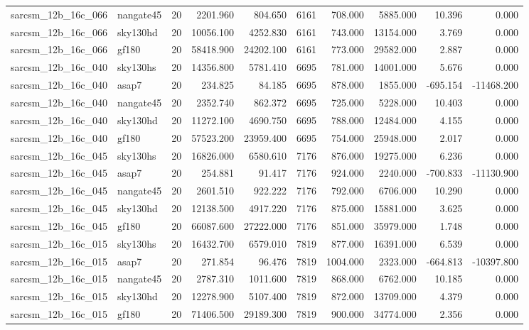 \begin{longtable}{llrrrrrrrr}
sarcsm\_12b\_16c\_066 & nangate45 & 20 & 2201.960 & 804.650 & 6161 & 708.000 & 5885.000 & 10.396 & 0.000 \\
sarcsm\_12b\_16c\_066 & sky130hd & 20 & 10056.100 & 4252.830 & 6161 & 743.000 & 13154.000 & 3.769 & 0.000 \\
sarcsm\_12b\_16c\_066 & gf180 & 20 & 58418.900 & 24202.100 & 6161 & 773.000 & 29582.000 & 2.887 & 0.000 \\
sarcsm\_12b\_16c\_040 & sky130hs & 20 & 14356.800 & 5781.410 & 6695 & 781.000 & 14001.000 & 5.676 & 0.000 \\
sarcsm\_12b\_16c\_040 & asap7 & 20 & 234.825 & 84.185 & 6695 & 878.000 & 1855.000 & -695.154 & -11468.200 \\
sarcsm\_12b\_16c\_040 & nangate45 & 20 & 2352.740 & 862.372 & 6695 & 725.000 & 5228.000 & 10.403 & 0.000 \\
sarcsm\_12b\_16c\_040 & sky130hd & 20 & 11272.100 & 4690.750 & 6695 & 788.000 & 12484.000 & 4.155 & 0.000 \\
sarcsm\_12b\_16c\_040 & gf180 & 20 & 57523.200 & 23959.400 & 6695 & 754.000 & 25948.000 & 2.017 & 0.000 \\
sarcsm\_12b\_16c\_045 & sky130hs & 20 & 16826.000 & 6580.610 & 7176 & 876.000 & 19275.000 & 6.236 & 0.000 \\
sarcsm\_12b\_16c\_045 & asap7 & 20 & 254.881 & 91.417 & 7176 & 924.000 & 2240.000 & -700.833 & -11130.900 \\
sarcsm\_12b\_16c\_045 & nangate45 & 20 & 2601.510 & 922.222 & 7176 & 792.000 & 6706.000 & 10.290 & 0.000 \\
sarcsm\_12b\_16c\_045 & sky130hd & 20 & 12138.500 & 4917.220 & 7176 & 875.000 & 15881.000 & 3.625 & 0.000 \\
sarcsm\_12b\_16c\_045 & gf180 & 20 & 66087.600 & 27222.000 & 7176 & 851.000 & 35979.000 & 1.748 & 0.000 \\
sarcsm\_12b\_16c\_015 & sky130hs & 20 & 16432.700 & 6579.010 & 7819 & 877.000 & 16391.000 & 6.539 & 0.000 \\
sarcsm\_12b\_16c\_015 & asap7 & 20 & 271.854 & 96.476 & 7819 & 1004.000 & 2323.000 & -664.813 & -10397.800 \\
sarcsm\_12b\_16c\_015 & nangate45 & 20 & 2787.310 & 1011.600 & 7819 & 868.000 & 6762.000 & 10.185 & 0.000 \\
sarcsm\_12b\_16c\_015 & sky130hd & 20 & 12278.900 & 5107.400 & 7819 & 872.000 & 13709.000 & 4.379 & 0.000 \\
sarcsm\_12b\_16c\_015 & gf180 & 20 & 71406.500 & 29189.300 & 7819 & 900.000 & 34774.000 & 2.356 & 0.000 \\

\end{longtable}
